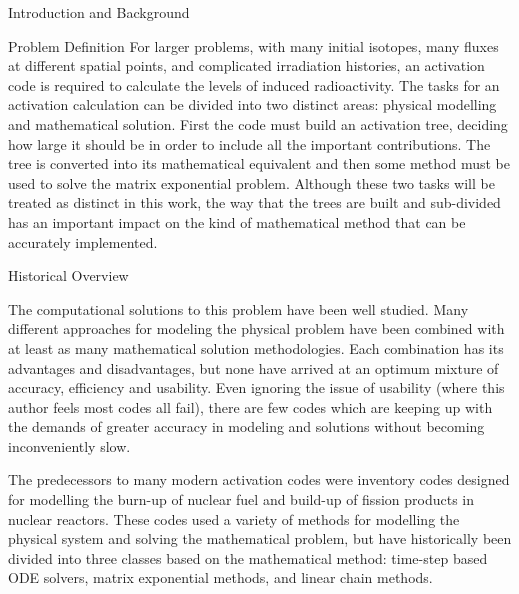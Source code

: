 \begin{chapter}{Introduction and Background}
\begin{section}{Problem Definition\label{sec:intro.prob_def}}
  For larger problems, with many initial isotopes, many fluxes at
  different spatial points, and complicated irradiation histories, an
  activation code is required to calculate the levels of induced
  radioactivity.  The tasks for an activation calculation can be
  divided into two distinct areas: physical modelling and mathematical
  solution.  First the code must build an activation tree, deciding
  how large it should be in order to include all the important
  contributions.  The tree is converted into its mathematical
  equivalent and then some method must be used to solve the matrix
  exponential problem.  Although these two tasks will be treated as
  distinct in this work, the way that the trees are built and
  sub-divided has an important impact on the kind of mathematical
  method that can be accurately implemented.

\end{section}

\begin{section}{Historical Overview}
  
  The computational solutions to this problem have been well studied.
  Many different approaches for modeling the physical problem have
  been combined with at least as many mathematical solution
  methodologies.  Each combination has its advantages and
  disadvantages, but none have arrived at an optimum mixture of
  accuracy, efficiency and usability.  Even ignoring the issue of
  usability (where this author feels most codes all fail), there are
  few codes which are keeping up with the demands of greater accuracy
  in modeling and solutions without becoming inconveniently slow.

  The predecessors to many modern activation codes were inventory
  codes designed for modelling the burn-up of nuclear fuel and
  build-up of fission products in nuclear reactors.  These codes used
  a variety of methods for modelling the physical system and solving
  the mathematical problem, but have historically been divided into
  three classes based on the mathematical method: time-step based ODE
  solvers, matrix exponential methods, and linear chain methods.
  

\end{section}
\end{chapter}
